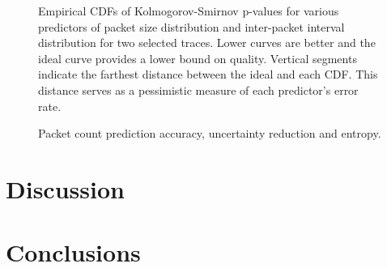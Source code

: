 \documentclass[conference]{IEEEtran}
\begin{document}
\begin{figure}[t]
\begin{center}
\caption{%
Empirical CDFs of Kolmogorov-Smirnov p-values for various predictors of packet size distribution and inter-packet interval distribution for two selected traces. Lower curves are better and the ideal curve provides a lower bound on quality.
Vertical segments indicate the farthest distance between the ideal and each CDF.
This distance serves as a pessimistic measure of each predictor's error rate.
}
\end{center}
\vspace{-2em}
\end{figure}

\begin{figure}[t]
\begin{center}
\hfill
{}\hfill
{}\hfill
{}\hfill
\caption{Packet count prediction accuracy, uncertainty reduction and entropy.}
\end{center}
\vspace{-2em}
\end{figure}

\section{Discussion}

\section{Conclusions}


\end{document}
